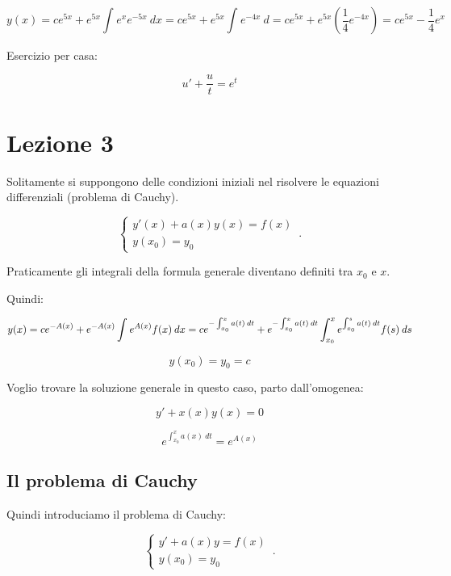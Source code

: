 \documentclass[11pt]{article}
\begin{document}
\[
    y(x) = c e ^{5x} + e ^{5x} \int_{{}}^{{}} {e^x e ^{-5x}} \: d{x} {} = c e ^{5x} + e ^{5x} \int_{{}}^{{}} {e ^{-4x}} \: d{} {} = c e ^{5x} + e ^{5x} (\frac{1}{4} e ^{-4x}) = c e ^{5x} - \frac{1}{4} e ^{x}
\]

Esercizio per casa:

\[
    u' + \frac{u}{t} = e ^{t}
\]

\section{Lezione 3}

Solitamente si suppongono delle condizioni iniziali nel risolvere le equazioni differenziali (problema di Cauchy).

\begin{equation}
    \begin{cases}
      y'(x)+a(x)y(x)=f(x)\\
      y(x_0)=y_0
    \end{cases}\,.
\end{equation}

Praticamente gli integrali della formula generale diventano definiti tra $x_0$ e $x$.

Quindi:

\[
    y(x) = ce ^{-A(x)}+ e ^{-A(x)} \int_{{}}^{{}} {e ^{A(x)}f(x)} \: d{x} {} = c e ^{-\int_{{x_0}}^{{x}} {a(t)} \: d{t} {}}+e ^{- \int_{{x_0}}^{{x}} {a(t)} \: d{t} {}}\int_{{x_0}}^{{x}} {e ^{\int_{{x_0}}^{{s}} {a(t)} \: d{t} {}}f(s)} \: d{s} {}\\
\]

\[
    y(x_0)=y_0=c
\]


Voglio trovare la soluzione generale in questo caso, parto dall'omogenea:

\[
    y'+x(x)y(x) = 0
\]

\[
    e ^{\int_{{x_0}}^{{x}} {a(x)} \: d{t} {}} = e ^{A(x)}
\]


\subsection{Il problema di Cauchy}

Quindi introduciamo il problema di Cauchy:

\begin{equation}
    \begin{cases}
      y'+a(x)y = f(x)\\
      y(x_0) = y_0
    \end{cases}\,.
\end{equation}
\end{document}
